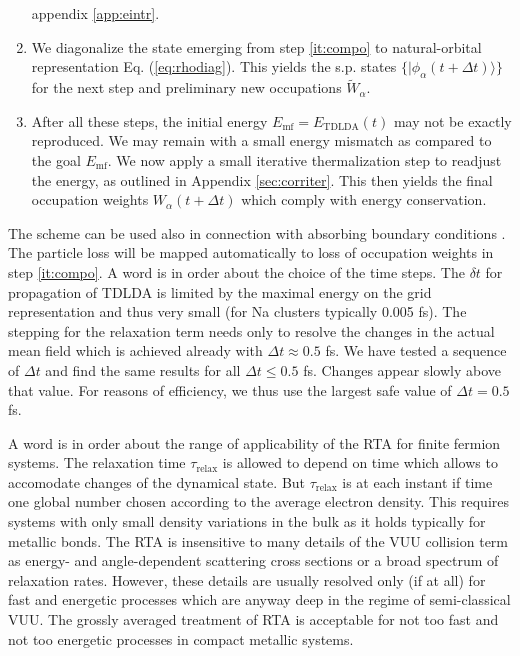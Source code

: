 \documentclass[final,1p]{elsarticle}
\newcommand{\PGR}[1]{{\color{blue} #1}}
\begin{document}
\begin{enumerate}
     appendix \ref{app:eintr}.
   \item \label{it:natural} 
     We diagonalize the state emerging from
     step \ref{it:compo} to natural-orbital representation
     Eq. (\ref{eq:rhodiag}).  This yields the s.p. states
     $\{|\phi_\alpha(t\!+\!\Delta{t})\rangle\}$ for the next step and
     preliminary new occupations $\tilde{W}_\alpha$.
   \item \label{it:therm} 
     After all these steps, the initial energy
     $E_\mathrm{mf}=E_\mathrm{TDLDA}(t)$ may not be exactly
     reproduced. We may remain with a small energy mismatch as
     compared to the goal $E_\mathrm{mf}$.  We now apply a small
     iterative thermalization step to readjust the energy, as outlined
     in Appendix \ref{sec:corriter}. This then yields the final
     occupation weights $W_\alpha(t\!+\!\Delta{t})$ which comply with
     energy conservation.
\end{enumerate}
The scheme can be used also in connection with absorbing boundary
conditions \cite{Cal00,Rei06c}. The particle loss will be mapped
automatically to loss of occupation weights in step \ref{it:compo}. A
word is in order about the choice of the time steps. The $\delta t$ for
propagation of TDLDA is limited by the maximal energy on the grid
representation and thus very small (for Na clusters typically 0.005
fs). The stepping for the relaxation term needs only to resolve the
changes in the actual mean field which is achieved already with
$\Delta t\approx 0.5$ fs. We have tested a sequence of $\Delta t$ and
find the same results for all $\Delta t\leq 0.5$ fs. Changes appear
slowly above that value.  For reasons of efficiency, we thus use the
largest safe value of $\Delta t= 0.5$ fs.


\PGR{A word is in order about the range of applicability of the RTA
  for finite fermion systems. The relaxation time
  $\tau_\mathrm{relax}$ is allowed to depend on time which allows to
  accomodate changes of the dynamical state. But $\tau_\mathrm{relax}$
  is at each instant if time one global number chosen according to the
  average electron density.  This requires systems with only small
  density variations in the bulk as it holds typically for metallic
  bonds.  The RTA is insensitive to many details of the VUU collision
  term as energy- and angle-dependent scattering cross sections or a
  broad spectrum of relaxation rates. However, these details are
  usually resolved only (if at all) for fast and energetic processes
  which are anyway deep in the regime of semi-classical VUU. The grossly
  averaged treatment of RTA is acceptable for not too fast and not too
  energetic processes in compact metallic systems.}
\end{document}
